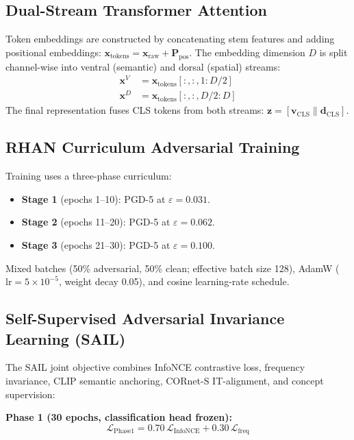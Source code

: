 \documentclass[12pt,a4paper]{article}
\begin{document}
\subsection{Dual-Stream Transformer Attention}

Token embeddings are constructed by concatenating stem features and
adding positional embeddings:
$\mathbf{x}_{\mathrm{tokens}} = \mathbf{x}_{\mathrm{raw}} +
\mathbf{P}_{\mathrm{pos}}$.
The embedding dimension $D$ is split channel-wise into ventral (semantic)
and dorsal (spatial) streams:
\begin{align}
  \mathbf{x}^V &= \mathbf{x}_{\mathrm{tokens}}[:, :, 1:D/2] \\
  \mathbf{x}^D &= \mathbf{x}_{\mathrm{tokens}}[:, :, D/2:D]
\end{align}
The final representation fuses CLS tokens from both streams:
$\mathbf{z} = [\mathbf{v}_{\mathrm{CLS}} \| \mathbf{d}_{\mathrm{CLS}}]$.

\subsection{RHAN Curriculum Adversarial Training}

Training uses a three-phase curriculum:
\begin{itemize}[leftmargin=1.5em]
  \item \textbf{Stage 1} (epochs 1--10): PGD-5 at $\varepsilon{=}0.031$.
  \item \textbf{Stage 2} (epochs 11--20): PGD-5 at $\varepsilon{=}0.062$.
  \item \textbf{Stage 3} (epochs 21--30): PGD-5 at $\varepsilon{=}0.100$.
\end{itemize}
Mixed batches (50\% adversarial, 50\% clean; effective batch size 128),
AdamW ($\text{lr}{=}5{\times}10^{-5}$, weight decay 0.05), and cosine
learning-rate schedule.

\subsection{Self-Supervised Adversarial Invariance Learning (SAIL)}

The SAIL joint objective combines InfoNCE contrastive loss, frequency
invariance, CLIP semantic anchoring, CORnet-S IT-alignment, and concept
supervision:

\textbf{Phase 1 (30 epochs, classification head frozen):}
\begin{equation}
  \mathcal{L}_{\text{Phase1}} = 0.70\, \mathcal{L}_{\text{InfoNCE}}
  + 0.30\, \mathcal{L}_{\text{freq}}
\end{equation}
\end{document}
